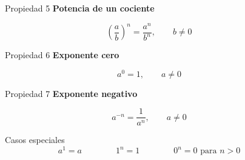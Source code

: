 \documentclass[aspectratio=169,10pt,handout]{beamer}
\newcommand{\iconoDesarrollo}{\faBrain}
\begin{document}
	\begin{frame}{\iconoDesarrollo\ \ Propiedad 5}
		\centering
		{\Large\bfseries Potencia de un cociente}
		
		\vspace{0.35cm}
		
		\[
		\left(\frac{a}{b}\right)^n=\frac{a^n}{b^n},\qquad b\neq0
		\]
		
	\end{frame}
	
	\begin{frame}{\iconoDesarrollo\ \ Propiedad 6}
		\centering
		{\Large\bfseries Exponente cero}
		
		\vspace{0.35cm}
		
		\[
		a^0=1,\qquad a\neq0
		\]
		
	\end{frame}
	
	\begin{frame}{\iconoDesarrollo\ \ Propiedad 7}
		\centering
		{\Large\bfseries Exponente negativo}
		
		\vspace{0.35cm}
		
		\[
		a^{-n}=\frac{1}{a^n},\qquad a\neq0
		\]
		
	\end{frame}
	
	\begin{frame}{\iconoDesarrollo\ \ Casos especiales}
		\centering
		\[
		a^1=a
		\qquad\qquad
		1^n=1
		\qquad\qquad
		0^n=0 \text{ para } n>0
		\]
		
	\end{frame}
	
\end{document}
